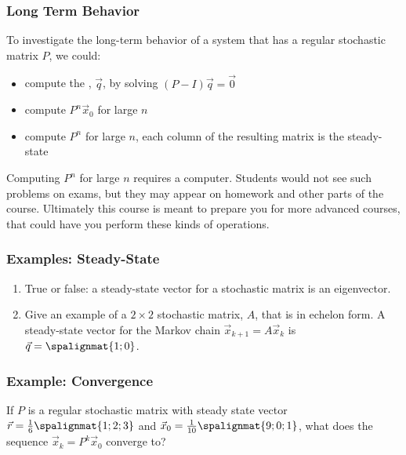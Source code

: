 \begin{frame}\frametitle{Long Term Behavior}

   To investigate the long-term behavior of a system that has a regular stochastic matrix $P$, we could: 
   
   \begin{itemize}
       \item compute the , $\vec q$, by solving $(P-I)\vec q = \vec 0$
       \item compute $P^n \vec x_0$ for large $n$
       \item compute $P^n$ for large $n$, each column of the resulting matrix is the steady-state       
   \end{itemize}
 
    \vspace{12pt}
    \pause 
    Computing $P^n$ for large $n$ requires a computer. Students would not see such problems on exams, but they may appear on homework and other parts of the course. Ultimately this course is meant to prepare you for more advanced courses, that could have you perform these kinds of operations. 
   
\end{frame}



\begin{frame}\frametitle{Examples: Steady-State}

    \begin{enumerate}

        \item True or false: a steady-state vector for a stochastic matrix is an eigenvector. 
        
        \item Give an example of a $2\times2$ stochastic matrix, $A$, that is in echelon form. A steady-state vector for the Markov chain $\vec x_{k+1} = A \vec x_k$ is $\vec q =  \spalignmat{1;0}$.
        
    \end{enumerate}

\end{frame}


\begin{frame}\frametitle{Example: Convergence}

    If $P$ is a regular stochastic matrix with steady state vector $\vec r = \frac{1}{6} \spalignmat{1; 2 ;3}$ and $\vec x_0 = \frac{1}{10} \spalignmat{9;0;1}$, what does the sequence $\vec x_k = P^k \vec x_{0}$ converge to?


\end{frame}

